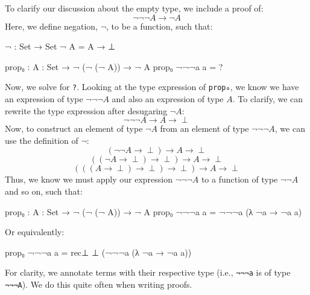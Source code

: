 \documentclass[12pt]{article}
\begin{document}
To clarify our discussion about the empty type, we include a proof of:
$$\neg\neg\neg A\rightarrow\neg A$$
Here, we define negation, \(\neg\), to be a function, such that:
\begin{center}
\begin{minipage}{0.9\textwidth}
\begin{code}
¬ : Set → Set
¬ A = A → ⊥

prop₀ : {A : Set} → ¬ (¬ (¬ A)) → ¬ A
prop₀ ¬¬¬a a = ?
\end{code}
\end{minipage}
\end{center}
Now, we solve for {\tt ?}. Looking at the type expression of {\tt prop₀},
we know we have an expression of type \(\neg\neg\neg A\) and also an
expression of type \(A\). To clarify, we can rewrite the type expression
after desugaring \(\neg A\):
$$\neg\neg\neg A\rightarrow A\rightarrow\perp$$
Now, to construct an element of type \(\neg A\) from an element of type
\(\neg\neg\neg A\), we can use the definition of \(\neg\):
$$(\neg\neg A\rightarrow\perp)\rightarrow A\rightarrow\perp$$
$$((\neg A\rightarrow\perp)\rightarrow\perp)\rightarrow A\rightarrow\perp$$
$$(((A\rightarrow\perp)\rightarrow\perp)\rightarrow\perp)\rightarrow A\rightarrow\perp$$
Thus, we know we must apply our expression \(\neg\neg\neg A\) to a function
of type \(\neg\neg A\) and so on, such that:
\begin{center}
\begin{minipage}{0.9\textwidth}
\begin{code}
prop₀ : {A : Set} → ¬ (¬ (¬ A)) → ¬ A
prop₀ ¬¬¬a a = ¬¬¬a (λ ¬a → ¬a a)
\end{code}
\end{minipage}
\end{center}
Or equivalently:
\begin{center}
\begin{minipage}{0.9\textwidth}
\begin{code}
prop₀ ¬¬¬a a = rec⊥ ⊥ (¬¬¬a (λ ¬a → ¬a a))
\end{code}
\end{minipage}
\end{center}
For clarity, we annotate terms with their respective type (i.e., {\tt ¬¬¬a} is
of type {\tt ¬¬¬A}). We do this quite often when writing proofs.
\end{document}
